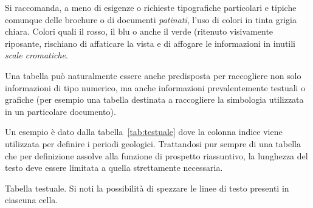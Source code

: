 Si raccomanda, a meno di esigenze o richieste tipografiche particolari e tipiche comunque delle brochure o di documenti \textit{patinati}, l'uso di colori in tinta grigia chiara. Colori quali il rosso, il blu o anche il verde (ritenuto visivamente riposante, rischiano di affaticare la vista e di affogare le informazioni in inutili \textit{scale cromatiche}.

Una tabella  può naturalmente essere anche predisposta per raccogliere non solo informazioni di tipo numerico, ma anche informazioni prevalentemente testuali o grafiche (per esempio una tabella destinata a raccogliere la simbologia utilizzata in un particolare documento).

Un esempio è dato dalla tabella~\ref{tab:testuale} dove la colonna indice viene utilizzata per definire i periodi geologici. Trattandosi pur sempre di una tabella che per definizione assolve alla funzione di prospetto riassuntivo, la lunghezza del testo deve essere limitata a quella strettamente necessaria.
\begin{table}[htp]
 \centering\small
 \caption[Tabella testuale.]{Tabella testuale. Si noti la possibilità di spezzare le linee di testo presenti in ciascuna cella.}
 \tabtestuale
 \label{tab:testuale}
\end{table}








